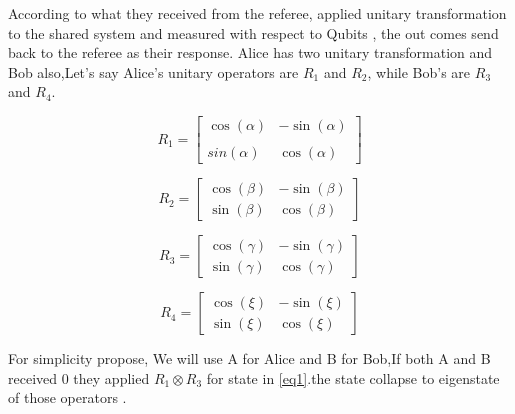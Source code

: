 	  
According to what they received from the referee, applied unitary transformation to the shared system  and measured with respect to  Qubits , the out comes send back to the referee as their response. Alice has two unitary transformation and Bob also,Let's say Alice's unitary operators  are $R_1$ and $R_2$, while Bob's are $R_3$ and $R_4$.
	 
$$	R_1= \begin{bmatrix}
\cos(\alpha) & -\sin(\alpha)\\
\\sin(\alpha) &  \cos(\alpha)
\end{bmatrix}$$	

	
 $$	R_2= \begin{bmatrix}
 \cos(\beta)  &  -\sin(\beta) \\
  \sin(\beta) &  \cos(\beta)
 \end{bmatrix}
 $$
 	

 
 $$
 R_3= \begin{bmatrix}
 \cos(\gamma)  &  -\sin(\gamma) \\
 \sin(\gamma)  &  \cos(\gamma)
 \end{bmatrix}
 $$	

$$
R_4= \begin{bmatrix}
\cos(\xi)  &  -\sin(\xi) \\
\sin(\xi) &  \cos(\xi)
\end{bmatrix}
$$

For simplicity propose,  We will use A for Alice and B for Bob,If both A and B  received $0$ they applied $R_1\otimes R_3$ for  state in \ref{eq1}.the state collapse to eigenstate of those operators .



